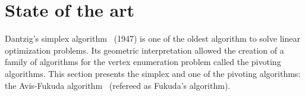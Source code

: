 \section{State of the art}
\label{section_sota}
Dantzig's simplex algorithm~\cite{simplex} (1947) is one of the oldest algorithm to solve linear optimization problems. Its geometric interpretation allowed the creation of a family of algorithms for the vertex enumeration problem called the pivoting algorithms. This section presents the simplex and one of the pivoting algorithms: the Avis-Fukuda algorithm~\cite{fukuda} (refereed as Fukuda's algorithm).


